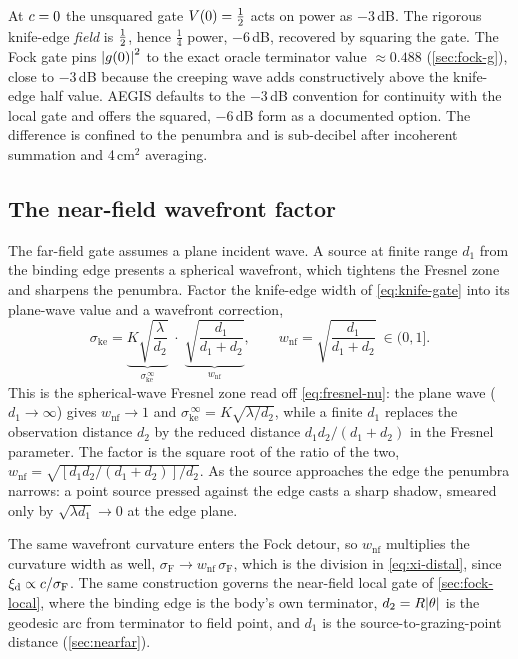 \begin{remark}\label{rem:boundary-db}
At $c=0$ the unsquared gate $V(0)=\tfrac{1}{2}$ acts on power as $-3$\,dB. The rigorous
knife-edge \emph{field} is $\tfrac{1}{2}$, hence $\tfrac14$ power, $-6$\,dB, recovered by
squaring the gate. The Fock gate pins $\abs{g(0)}^2$ to the exact oracle terminator
value $\approx0.488$ (\cref{sec:fock-g}), close to $-3$\,dB because the creeping
wave adds constructively above the knife-edge half value. AEGIS defaults to the
$-3$\,dB convention for continuity with the local gate and offers the squared,
$-6$\,dB form as a documented option. The difference is confined to the penumbra
and is sub-decibel after incoherent summation and 4\,cm$^2$ averaging.
\end{remark}

\subsection{The near-field wavefront factor}\label{sec:cmetric-nf}

The far-field gate assumes a plane incident wave. A source at finite range $d_1$
from the binding edge presents a spherical wavefront, which tightens the Fresnel
zone and sharpens the penumbra. Factor the knife-edge width of
\cref{eq:knife-gate} into its plane-wave value and a wavefront correction,
\begin{equation}\label{eq:wnf}
  \sigma_{\mathrm{ke}}
  = \underbrace{K\sqrt{\frac{\lambda}{d_2}}}_{\sigma_{\mathrm{ke}}^{\,\infty}}
    \;\cdot\;
    \underbrace{\sqrt{\frac{d_1}{d_1+d_2}}}_{w_{\mathrm{nf}}},
  \qquad
  w_{\mathrm{nf}} = \sqrt{\frac{d_1}{d_1+d_2}}\ \in(0,1].
\end{equation}
This is the spherical-wave Fresnel zone read off \cref{eq:fresnel-nu}: the plane
wave ($d_1\to\infty$) gives $w_{\mathrm{nf}}\to1$ and
$\sigma_{\mathrm{ke}}^{\,\infty}=K\sqrt{\lambda/d_2}$, while a finite $d_1$ replaces
the observation distance $d_2$ by the reduced distance $d_1d_2/(d_1+d_2)$ in the
Fresnel parameter. The factor is the square root of the ratio of the two,
$w_{\mathrm{nf}}=\sqrt{[d_1d_2/(d_1+d_2)]/d_2}$. As the source approaches the edge
the penumbra narrows: a point source pressed against the edge casts a sharp
shadow, smeared only by $\sqrt{\lambda d_1}\to0$ at the edge plane.

The same wavefront curvature enters the Fock detour, so $w_{\mathrm{nf}}$
multiplies the curvature width as well, $\sigma_{\mathrm{F}}\to w_{\mathrm{nf}}\,
\sigma_{\mathrm{F}}$, which is the division in \cref{eq:xi-distal}, since
$\xi_{\mathrm d}\propto c/\sigma_{\mathrm{F}}$. The same construction governs the
near-field local gate of \cref{sec:fock-local}, where the binding edge is the
body's own terminator, $d_2=R\abs{\theta}$ is the geodesic arc from terminator
to field point, and $d_1$ is the source-to-grazing-point distance
(\cref{sec:nearfar}).

